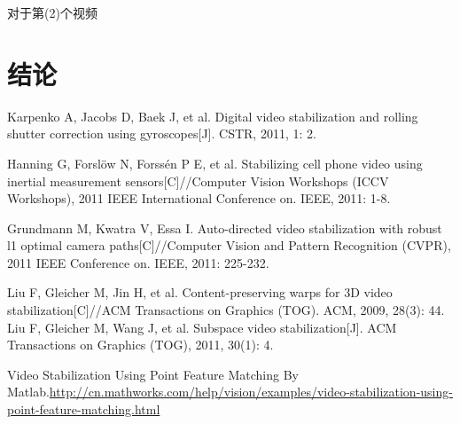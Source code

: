 \documentclass[journal, a4paper]{IEEEtran}
\begin{document}
    对于第(2)个视频
    
\section{结论}


\begin{thebibliography}{5}

Karpenko A, Jacobs D, Baek J, et al. Digital video stabilization and rolling shutter correction using gyroscopes[J]. CSTR, 2011, 1: 2.

    Hanning G, Forslöw N, Forssén P E, et al. Stabilizing cell phone video using inertial measurement sensors[C]//Computer Vision Workshops (ICCV Workshops), 2011 IEEE International Conference on. IEEE, 2011: 1-8.
    
    Grundmann M, Kwatra V, Essa I. Auto-directed video stabilization with robust l1 optimal camera paths[C]//Computer Vision and Pattern Recognition (CVPR), 2011 IEEE Conference on. IEEE, 2011: 225-232.
    
    Liu F, Gleicher M, Jin H, et al. Content-preserving warps for 3D video stabilization[C]//ACM Transactions on Graphics (TOG). ACM, 2009, 28(3): 44.
    Liu F, Gleicher M, Wang J, et al. Subspace video stabilization[J]. ACM Transactions on Graphics (TOG), 2011, 30(1): 4.
    
    Video Stabilization Using Point Feature Matching By Matlab.\url{http://cn.mathworks.com/help/vision/examples/video-stabilization-using-point-feature-matching.html}
    

\end{thebibliography}

\end{document}

